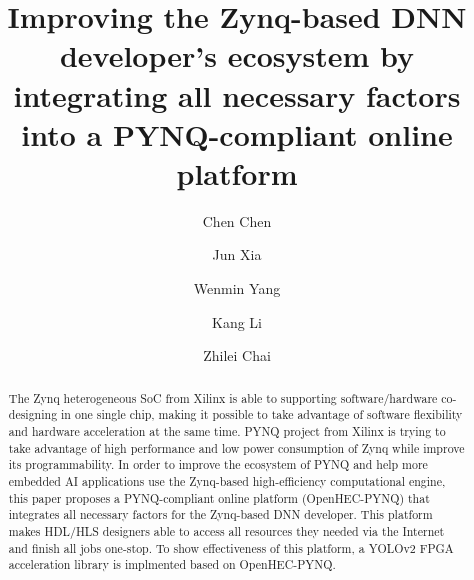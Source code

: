 \documentclass[sigconf]{acmart}
\begin{document}
\title{Improving the Zynq-based DNN developer's ecosystem by integrating all necessary factors into a PYNQ-compliant online platform}


\author{Chen Chen}

\author{Jun Xia}

\author{Wenmin Yang}

\author{Kang Li}

\author{Zhilei Chai}


\renewcommand{\shortauthors}{C. Chen et al.}


\begin{abstract}
The Zynq heterogeneous SoC from Xilinx is able to supporting software/hardware co-designing in one single chip, making it possible to take advantage of software flexibility and hardware acceleration at the same time. PYNQ project from Xilinx is trying to take advantage of high performance and low power consumption of Zynq while improve its programmability. In order to improve the ecosystem of PYNQ and help more embedded AI applications use the Zynq-based high-efficiency computational engine, this paper proposes a PYNQ-compliant online platform (OpenHEC-PYNQ) that integrates all necessary factors for the Zynq-based DNN developer. This platform makes HDL/HLS designers able to access all resources they needed via the Internet and finish all jobs one-stop. To show effectiveness of this platform, a YOLOv2 FPGA acceleration library is implmented based on OpenHEC-PYNQ. 
\end{abstract}
\end{document}
